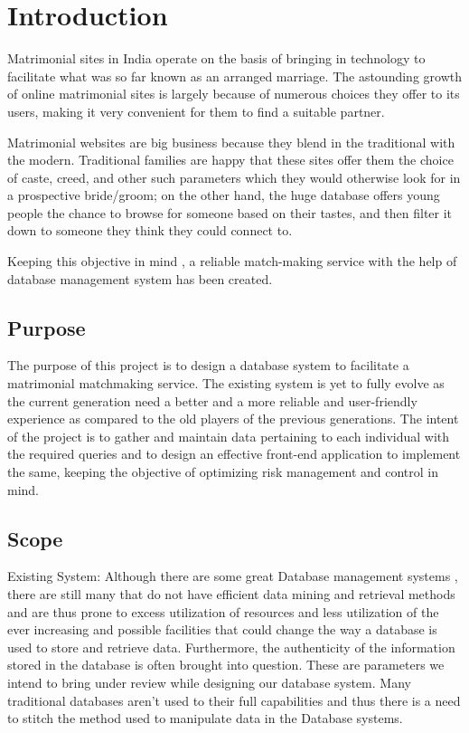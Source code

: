 \documentclass[12pt]{report}
\begin{document}
\chapter{Introduction}\label{ch:introduction}
Matrimonial sites in India operate on the basis of bringing in technology to facilitate what was so far known as an arranged marriage. The astounding growth of online matrimonial sites is largely because of numerous choices they offer to its users, making it very convenient for them to find a suitable partner.

Matrimonial websites are big business because they blend in the traditional with the modern. Traditional families are happy that these sites offer them the choice of caste, creed, and other such parameters which they would otherwise look for in a prospective bride/groom; on the other hand, the huge database offers young people the chance to browse for someone based on their tastes, and then filter it down to someone they think they could connect to.

Keeping this objective in mind , a reliable match-making service with the help of database management system has been created.




\section{Purpose}
The purpose of this project is to design a database system to facilitate a matrimonial matchmaking service. The existing system is yet to fully evolve as the current generation need a better and a more reliable and user-friendly experience as compared to the old players of the previous generations. 
The intent of the project is to gather and maintain data pertaining to each individual with the required queries and to design an effective front-end application to implement the same, keeping the objective of optimizing risk management and control in mind. 


\section{Scope}
Existing System:
Although there are some great Database management systems , there are still many that do not have  efficient data mining and retrieval methods and are thus prone to excess utilization of resources and less utilization of the ever increasing and possible facilities that could change the way a database is used to store and retrieve data. Furthermore, the authenticity of the information stored in the database is often brought into question. These are parameters we intend to bring under review while designing our database system. Many traditional databases aren’t used to their full capabilities and thus there is a need to stitch the method used to manipulate data in the Database systems.
\end{document}
